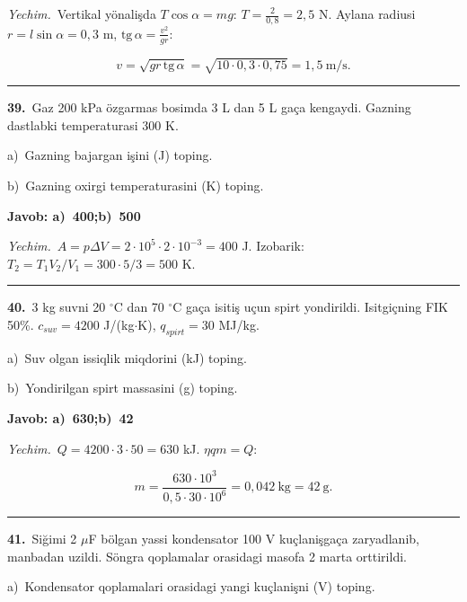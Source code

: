 \documentclass[11pt,a4paper]{article}
\begin{document}
\noindent\textit{Yechim.}\ Vertikal yönalişda $T\cos\alpha=mg$: $T=\frac{2}{0{,}8}=2{,}5$ N. Aylana radiusi $r=l\sin\alpha=0{,}3$ m, $\mathrm{tg}\,\alpha=\frac{v^2}{gr}$:\par
\[v=\sqrt{gr\,\mathrm{tg}\,\alpha}=\sqrt{10\cdot0{,}3\cdot0{,}75}=1{,}5\ \text{m/s}.\]\par\medskip\hrule\medskip
{}\noindent\textbf{39.}\ Gaz 200 kPa özgarmas bosimda 3 L dan 5 L gaça kengaydi. Gazning dastlabki temperaturasi 300 K.\par
\noindent\hspace*{4mm}a)\ Gazning bajargan işini (J) toping.\par
\noindent\hspace*{4mm}b)\ Gazning oxirgi temperaturasini (K) toping.\par
\noindent\colorbox{gray!12}{\parbox{\dimexpr\linewidth-2\fboxsep}{\textbf{Javob: a)\ 400;\quad b)\ 500}}}\par\smallskip
\noindent\textit{Yechim.}\ $A=p\Delta V=2\cdot10^5\cdot2\cdot10^{-3}=400$ J. Izobarik: $T_2=T_1V_2/V_1=300\cdot5/3=500$ K.\par\par\medskip\hrule\medskip
{}\noindent\textbf{40.}\ 3 kg suvni 20 $^\circ$C dan 70 $^\circ$C gaça isitiş uçun spirt yondirildi. Isitgiçning FIK 50\%. $c_{suv}=4200$ J/(kg$\cdot$K), $q_{spirt}=30$ MJ/kg.\par
\noindent\hspace*{4mm}a)\ Suv olgan issiqlik miqdorini (kJ) toping.\par
\noindent\hspace*{4mm}b)\ Yondirilgan spirt massasini (g) toping.\par
\noindent\colorbox{gray!12}{\parbox{\dimexpr\linewidth-2\fboxsep}{\textbf{Javob: a)\ 630;\quad b)\ 42}}}\par\smallskip
\noindent\textit{Yechim.}\ $Q=4200\cdot3\cdot50=630$ kJ. $\eta qm=Q$:\par
\[m=\frac{630\cdot10^3}{0{,}5\cdot30\cdot10^6}=0{,}042\ \text{kg}=42\ \text{g}.\]\par\medskip\hrule\medskip
{}\noindent\textbf{41.}\ Siğimi 2 $\mu$F bölgan yassi kondensator 100 V kuçlanişgaça zaryadlanib, manbadan uzildi. Söngra qoplamalar orasidagi masofa 2 marta orttirildi.\par
\noindent\hspace*{4mm}a)\ Kondensator qoplamalari orasidagi yangi kuçlanişni (V) toping.\par
\end{document}
